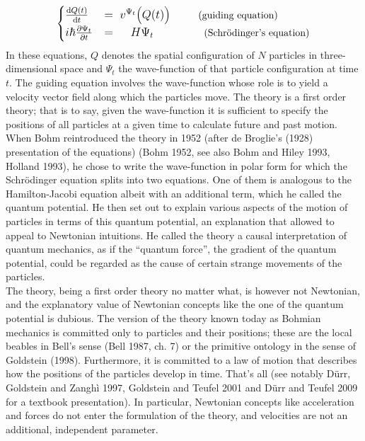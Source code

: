 \documentclass[12pt,a4paper]{article}
\theoremstyle{definition}
\begin{document}
\begin{align*}
\large
\begin{cases} \frac{\mathrm{d} Q(t)}{\mathrm{d}t} &= \; v^{\Psi_t}\bigl(Q(t)\bigr) \hspace*{1cm} \text{\normalsize (guiding equation)}\\
i \hbar \frac{\partial \Psi_t}{\partial t} & = \hspace*{.5cm} H \Psi_t \hspace*{1.8cm} \text{\normalsize (Schr\"odinger's equation)}
\end{cases}
\end{align*}
In these equations, $Q$ denotes the spatial configuration of $N$ particles in three-dimensional space and $\Psi_t$ the wave-function of that particle configuration at time $t$. The guiding equation involves the wave-function whose role is to yield a velocity vector field along which the particles move. The theory is a first order theory; that is to say, given the wave-function it is sufficient to specify the positions of all particles at a given time to calculate future and past motion.\\
When Bohm reintroduced the theory in 1952 (after de Broglie's (1928) presentation of the equations) (Bohm 1952, see also Bohm and Hiley 1993, Holland 1993), he chose to write the wave-function in polar form for which the Schr\"odinger equation splits into two equations. One of them is analogous to the Hamilton-Jacobi equation albeit with an additional term, which he called the quantum potential. He then set out to explain various aspects of the motion of particles in terms of this quantum potential, an explanation that allowed to appeal to Newtonian intuitions. He called the theory a causal interpretation of quantum mechanics, as if the ``quantum force'', the gradient of the quantum potential, could be regarded as the cause of certain strange movements of the particles.\\
The theory, being a first order theory no matter what, is however not Newtonian, and the explanatory value of Newtonian concepts like the one of the quantum potential is dubious. The version of the theory known today as Bohmian mechanics is committed only to particles and their positions; these are the local beables in Bell's sense (Bell 1987, ch. 7) or the primitive ontology in the sense of Goldstein (1998). Furthermore, it is committed to a law of motion that describes how the positions of the particles develop in time. That's all (see notably D\"urr, Goldstein and Zangh\`i 1997, Goldstein and Teufel 2001 and D\"urr and Teufel 2009 for a textbook presentation). In particular, Newtonian concepts like acceleration and forces do not enter the formulation of the theory, and velocities are not an additional, independent parameter.\\
\end{document}
